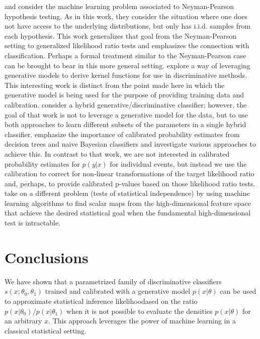 \documentclass[11pt, oneside]{article}   	%
\begin{document}
\cite{ClaytonScott} and \cite{JMLR:v14:tong13a} consider the machine learning problem associated to Neyman-Pearson hypothesis testing. As in this work, they consider the situation where one does not have access to the underlying distributions, but only has i.i.d. samples from each hypothesis. This work generalizes that goal from the Neyman-Pearson setting to generalized likelihood ratio tests and emphasizes the connection with classification. Perhaps a  formal treatment similar to the Neyman-Pearson case can be brought to bear in this more general setting.
\cite{TommiJaakkola} explore a way of leveraging generative models to derive kernel functions for use in discriminative methods. This interesting work is distinct from the point made here in which the generative model is being used for the purpose of providing training data and calibration.  \cite{McCallum}
 consider a hybrid generative/discriminative classifier; however, the goal of that work is not to leverage a generative model for the data, but to use both approaches to learn different subsets of the parameters in a single hybrid classifier.  \cite{BiancaZadrozny} emphasize the importance of calibrated probability estimates from decision trees and naive Bayesian classifiers and investigate various approaches to achieve this. In contrast to that work, we are not interested in calibrated probability estimates for $p(y|x)$ for individual events, but instead we use the calibration to correct for non-linear transformations of the target likelihood ratio and, perhaps, to provide calibrated p-values based on those likelihood ratio tests. \cite{Ihler2004} take on a different problem (tests of statistical independence) by using machine learning algorithms to find  scalar maps from the high-dimensional feature space that achieve the desired statistical goal when the fundamental high-dimensional test is intractable.


\section{Conclusions}

We have shown that a parametrized family of discriminative classifiers $s(x; \theta_0, \theta_1)$ trained and calibrated with a generative model $p(x|\theta)$ can be used to approximate statistical inference likelihoodased on the  ratio $p(x|\theta_0)/p(x|\theta_1)$ when it is not possible to evaluate the densities $p(x|\theta)$ for an arbitrary $x$. This approach leverages the power of machine learning in a classical statistical setting.
\end{document}
